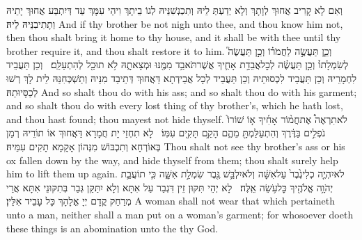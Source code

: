 {וְאִם לָא קָרִיב אֲחוּךְ לְוָתָךְ וְלָא יְדַעְתְּ לֵיהּ וְתִכְנְשִׁנֵּיהּ לְגוֹ בֵיתָךְ וִיהֵי עִמָּךְ עַד דְּיִתְבַּע אֲחוּךְ יָתֵיהּ וְתָתִיבִנֵּיהּ לֵיהּ׃}
{And if thy brother be not nigh unto thee, and thou know him not, then thou shalt bring it home to thy house, and it shall be with thee until thy brother require it, and thou shalt restore it to him.}{}
{וְכֵ֧ן תַּעֲשֶׂ֣ה לַחֲמֹר֗וֹ וְכֵ֣ן תַּעֲשֶׂה֮ לְשִׂמְלָתוֹ֒ וְכֵ֣ן תַּעֲשֶׂ֗ה לְכׇל\maqqaf אֲבֵדַ֥ת אָחִ֛יךָ אֲשֶׁר\maqqaf תֹּאבַ֥ד מִמֶּ֖נּוּ וּמְצָאתָ֑הּ לֹ֥א תוּכַ֖ל לְהִתְעַלֵּֽם׃ \setuma }
{וְכֵן תַּעֲבֵיד לִחְמָרֵיהּ וְכֵן תַּעֲבֵיד לִכְסוּתֵיהּ וְכֵן תַּעֲבֵיד לְכָל אֲבֵידְתָא דַּאֲחוּךְ דְּתֵיבַד מִנֵּיהּ וְתַשְׁכְּחִנַּהּ לֵית לָךְ רְשׁוּ לְכַסָּיוּתַהּ׃}
{And so shalt thou do with his ass; and so shalt thou do with his garment; and so shalt thou do with every lost thing of thy brother’s, which he hath lost, and thou hast found; thou mayest not hide thyself.}{}
{לֹא\maqqaf תִרְאֶה֩ אֶת\maqqaf חֲמ֨וֹר אָחִ֜יךָ א֤וֹ שׁוֹרוֹ֙ נֹפְלִ֣ים בַּדֶּ֔רֶךְ וְהִתְעַלַּמְתָּ֖ מֵהֶ֑ם הָקֵ֥ם תָּקִ֖ים עִמּֽוֹ׃ \setuma }
{לָא תִחְזֵי יָת חֲמָרָא דַּאֲחוּךְ אוֹ תוֹרֵיהּ רְמַן בְּאוֹרְחָא וְתִכְבּוֹשׁ מִנְּהוֹן אָקָמָא תָקִים עִמֵּיהּ׃}
{Thou shalt not see thy brother’s ass or his ox fallen down by the way, and hide thyself from them; thou shalt surely help him to lift them up again.}{}
{לֹא\maqqaf יִהְיֶ֤ה כְלִי\maqqaf גֶ֙בֶר֙ עַל\maqqaf אִשָּׁ֔ה וְלֹא\maqqaf יִלְבַּ֥שׁ גֶּ֖בֶר שִׂמְלַ֣ת אִשָּׁ֑ה כִּ֧י תוֹעֲבַ֛ת יְהֹוָ֥ה אֱלֹהֶ֖יךָ כׇּל\maqqaf עֹ֥שֵׂה אֵֽלֶּה׃ \petucha }
{לָא יְהֵי תִּקּוּן זֵין דִּגְבַר עַל אִתָּא וְלָא יִתַּקַּן גְּבַר בְּתִקּוּנֵי אִתָּא אֲרֵי מְרַחַק קֳדָם יְיָ אֱלָהָךְ כָּל עָבֵיד אִלֵּין׃}
{A woman shall not wear that which pertaineth unto a man, neither shall a man put on a woman’s garment; for whosoever doeth these things is an abomination unto the \lord\space thy God.}{}
